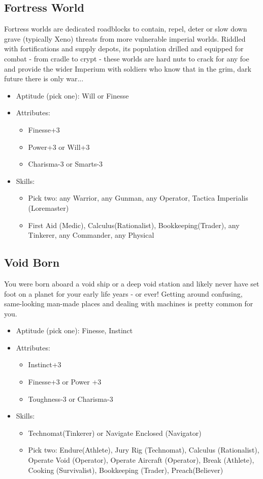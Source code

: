 	\subsection{Fortress World}
	Fortress worlds are dedicated roadblocks to contain, repel, deter or slow down grave (typically Xeno) threats from more vulnerable imperial worlds. Riddled with fortifications and supply depots, its population drilled and equipped for combat - from cradle to crypt - these worlds are hard nuts to crack for any foe and provide the wider Imperium with soldiers who know that in the grim, dark future there is only war...

	\begin{itemize}
		\item Aptitude (pick one): Will or Finesse
		\item Attributes:
		\begin{itemize}
			\item Finesse+3
			\item Power+3 or Will+3
			\item Charisma-3 or Smarts-3
		\end{itemize}
		\item Skills: 
		\begin{itemize}
		 	\item Pick two: any Warrior, any Gunman, any Operator, Tactica Imperialis (Loremaster)
		 	\item First Aid (Medic), Calculus(Rationalist), Bookkeeping(Trader), any Tinkerer, any Commander, any Physical
		 \end{itemize} 
	\end{itemize}

	\subsection{Void Born}
	You were born aboard a void ship or a deep void station and likely never have set foot on a planet for your early life years - or ever! Getting around confusing, same-looking man-made places and dealing with machines is pretty common for you.
	\begin{itemize}
		\item Aptitude (pick one): Finesse, Instinct
		\item Attributes:
		\begin{itemize}
			\item Instinct+3
			\item Finesse+3 or Power +3
			\item Toughness-3 or Charisma-3
		\end{itemize}
		\item Skills: 
		\begin{itemize}
		 	\item Technomat(Tinkerer) or Navigate Enclosed (Navigator)
		 	\item Pick two: Endure(Athlete), Jury Rig (Technomat), Calculus (Rationalist), Operate Void (Operator), Operate Aircraft (Operator), Break (Athlete), Cooking (Survivalist), Bookkeeping (Trader), Preach(Believer)
		 \end{itemize} 
	\end{itemize}


